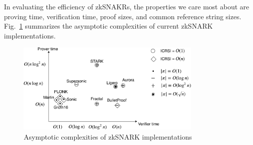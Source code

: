 \documentclass[acmlarge]{acmart}
\begin{document}
In evaluating the efficiency of zkSNAKRs, the properties we care most about are proving time, verification time, proof sizes, and common reference string sizes.
Fig.~\ref{fig:snark.sizes} summarizes the asymptotic complexities of current zkSNARK implementations.
\begin{figure}[ht!]
\includegraphics[width=0.8\textwidth]{images/snark-sizes.pdf}
\caption{Asymptotic complexities of zkSNARK implementations}
\label{fig:snark.sizes}
\Description{}
\end{figure}




\end{document}
